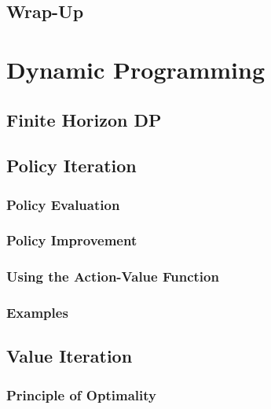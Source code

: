 	\section{Wrap-Up} %

\chapter{Dynamic Programming} %

	\section{Finite Horizon DP} %

	\section{Policy Iteration} %

		\subsection{Policy Evaluation} %

		\subsection{Policy Improvement} %

		\subsection{Using the Action-Value Function} %

		\subsection{Examples} %

	\section{Value Iteration} %

		\subsection{Principle of Optimality} %

